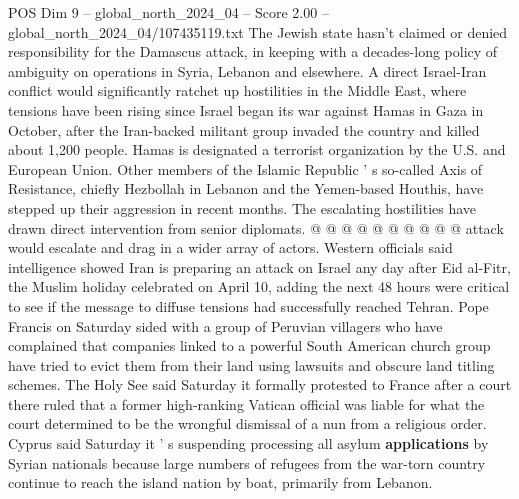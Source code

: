 \begin{textsample}{POS Dim 9 – global\_north\_2024\_04 – Score 2.00 – global\_north\_2024\_04/107435119.txt}
The Jewish state hasn't claimed or denied responsibility for the Damascus attack, in keeping with a decades-long policy of ambiguity on operations in Syria, Lebanon and elsewhere.
A direct Israel-Iran conflict would significantly ratchet up hostilities in the Middle East, where tensions have been rising since Israel began its war against Hamas in Gaza in October, after the Iran-backed militant group invaded the country and killed about 1,200 people.
Hamas is designated a terrorist organization by the U.S. and European Union.
Other members of the Islamic Republic ' s so-called Axis of Resistance, chiefly Hezbollah in Lebanon and the Yemen-based Houthis, have stepped up their aggression in recent months.
The escalating hostilities have drawn direct intervention from senior diplomats. @ @ @ @ @ @ @ @ @ @ attack would escalate and drag in a wider array of actors.
Western officials said intelligence showed Iran is preparing an attack on Israel any day after Eid al-Fitr, the Muslim holiday celebrated on April 10, adding the next 48 hours were critical to see if the message to diffuse tensions had successfully reached Tehran.
Pope Francis on Saturday sided with a group of Peruvian villagers who have complained that companies linked to a powerful South American church group have tried to evict them from their land using lawsuits and obscure land titling schemes.
The Holy See said Saturday it formally protested to France after a court there ruled that a former high-ranking Vatican official was liable for what the court determined to be the wrongful dismissal of a nun from a religious order.
Cyprus said Saturday it ' s suspending processing all asylum \textbf{applications} by Syrian nationals because large numbers of refugees from the war-torn country continue to reach the island nation by boat, primarily from Lebanon.

\end{textsample}
